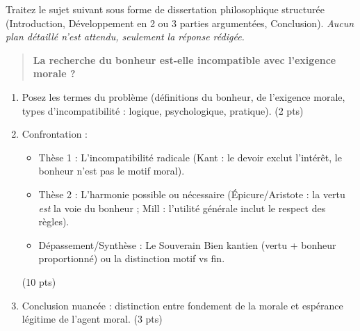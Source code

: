 \documentclass[11pt]{article}
\begin{document}
\begin{exercice}
\noindent Traitez le sujet suivant sous forme de dissertation philosophique structurée (Introduction, Développement en 2 ou 3 parties argumentées, Conclusion). \textit{Aucun plan détaillé n'est attendu, seulement la réponse rédigée.}
\begin{quote}
    \og \textbf{La recherche du bonheur est-elle incompatible avec l'exigence morale ?} \fg
\end{quote}
\begin{enumerate}
    \item Posez les termes du problème (définitions du bonheur, de l'exigence morale, types d'incompatibilité : logique, psychologique, pratique). (2 pts)
    \item Confrontation : 
    \begin{itemize}
        \item Thèse 1 : L'incompatibilité radicale (Kant : le devoir exclut l'intérêt, le bonheur n'est pas le motif moral).
        \item Thèse 2 : L'harmonie possible ou nécessaire (Épicure/Aristote : la vertu \textit{est} la voie du bonheur ; Mill : l'utilité générale inclut le respect des règles).
        \item Dépassement/Synthèse : Le \og Souverain Bien\fg{} kantien (vertu + bonheur proportionné) ou la distinction \og motif\fg{} vs \og fin\fg{}.
    \end{itemize}
    (10 pts)
    \item Conclusion nuancée : distinction entre \og fondement\fg{} de la morale et \og espérance\fg{} légitime de l'agent moral. (3 pts)
\end{enumerate}
\end{exercice}
\end{document}
